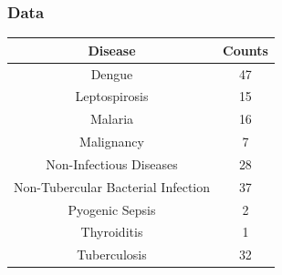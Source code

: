 \documentclass[pdf, 9pt]{beamer}
\begin{document}
	\begin{frame}
		\frametitle{Data}
		\begin{table}[]
			\begin{tabular}{|c|c|}
				\hline
				\textbf{Disease}                   & \textbf{Counts} \\ \hline
				Dengue                             & 47              \\
				Leptospirosis                      & 15              \\
				Malaria                            & 16              \\
				Malignancy                         & 7               \\
				Non-Infectious Diseases            & 28              \\
				Non-Tubercular Bacterial Infection & 37              \\
				Pyogenic Sepsis                    & 2               \\
				Thyroiditis                        & 1               \\
				Tuberculosis                       & 32              \\ \hline
			\end{tabular}
		\end{table}
	\end{frame}
	
\end{document}
